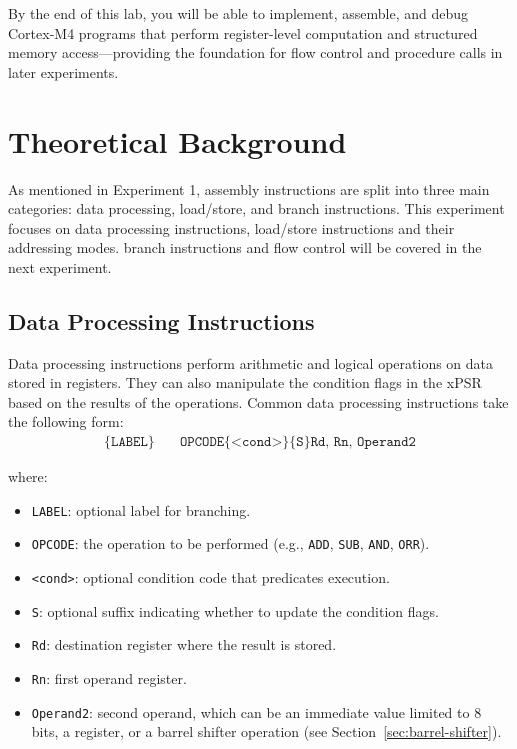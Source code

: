 By the end of this lab, you will be able to implement, assemble, and debug Cortex-M4 programs that perform register-level computation and structured memory access—providing the foundation for flow control and procedure calls in later experiments.

\newpage
{}
\localtableofcontents
\bigskip
\newpage
\section{Theoretical Background}
As mentioned in Experiment 1, assembly instructions are split into three main categories: data processing, load/store, and branch instructions. This experiment focuses on data processing instructions, load/store instructions and their addressing modes. branch instructions and flow control will be covered in the next experiment.
\subsection{Data Processing Instructions}
Data processing instructions perform arithmetic and logical operations on data stored in registers. They can also manipulate the condition flags in the xPSR based on the results of the operations. Common data processing instructions take the following form:
\[
\begin{aligned}
\texttt{\{LABEL\}} \quad & \texttt{OPCODE\{<cond>\}\{S\} Rd, Rn, Operand2}
\end{aligned}
\]

where:
\begin{itemize}[nosep]
    \item \texttt{LABEL}: optional label for branching.
    \item \texttt{OPCODE}: the operation to be performed (e.g., \texttt{ADD}, \texttt{SUB}, \texttt{AND}, \texttt{ORR}).
    \item \texttt{<cond>}: optional condition code that predicates execution.
    \item \texttt{S}: optional suffix indicating whether to update the condition flags.
    \item \texttt{Rd}: destination register where the result is stored.
    \item \texttt{Rn}: first operand register.
    \item \texttt{Operand2}: second operand, which can be an immediate value limited to 8 bits, a register, or a barrel shifter operation (see Section~\ref{sec:barrel-shifter}).
\end{itemize}


